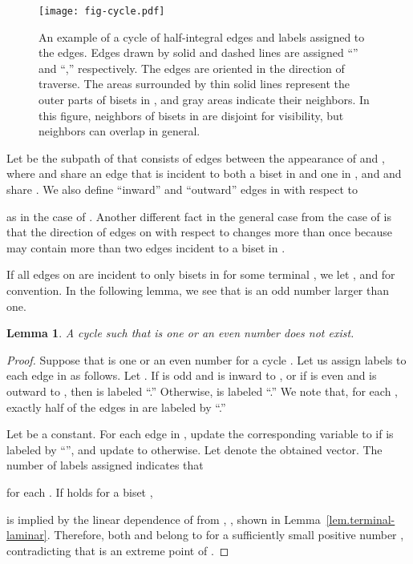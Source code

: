 \documentclass{article}
\newtheorem{lemma}{Lemma}
\begin{document}
\begin{figure}
\centering
\texttt{[image: fig-cycle.pdf]}
\caption{An example of a cycle of half-integral edges and labels assigned to the edges. 
Edges drawn by 
solid and dashed lines are assigned ``'' and ``,'' respectively.
The edges are oriented in the direction of traverse. The areas surrounded by thin solid lines
represent the outer parts of bisets in , and gray areas indicate their neighbors.
In this figure, neighbors of bisets in  are disjoint for visibility, but neighbors can overlap
in general.}
\label{fig.cicle}
\end{figure}

Let  be the subpath of  that consists of edges
between the appearance of  and , where
 and  share an edge that is incident to both a biset in
 and one in ,
and  and  share .
We also define ``inward'' and ``outward'' edges in  with respect to

as in the case of .
Another different fact in the general case from the case of  is
that the direction of edges on  with respect to  changes more
than once because  may contain more than two edges incident to a biset in .

If all edges on  are incident to only bisets in  for some
terminal , we let , and  for convention.
In the following lemma, we see that  is an odd number larger than one.

\begin{lemma}\label{lem.even}
A cycle such that  is one or an even number does not exist.
\end{lemma}
\begin{proof}
Suppose that  is one or an even number for a cycle .
 Let us assign labels to each edge in  as follows.
 Let .
 If  is odd and  is inward to , or if
  is even and  is outward to , 
 then  is labeled ``.''
 Otherwise,  is labeled ``.''
 We note that, for each ,
exactly half of the edges  in 
are labeled by ``.''

 Let  be a constant. 
 For each edge  in ,
 update the corresponding variable  to 
 if  is labeled by ``'',
 and update to  otherwise.
Let  denote the obtained vector.
The number of labels assigned indicates that 
 
 for each .
 If
  holds for a biset
 ,
 
is implied by the linear dependence of   from
 , , shown in Lemma~\ref{lem.terminal-laminar}.
Therefore, both  and 
 belong to 
 for a sufficiently small positive number
,
contradicting that  is an extreme point of .
\end{proof}
\end{document}
